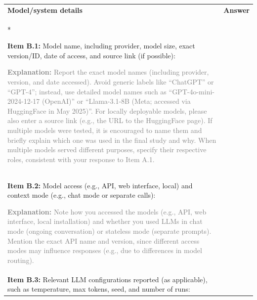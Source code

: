 \documentclass[12pt]{article}
\begin{document}
\begin{longtable}{|p{}|p{}|}
\hline
\rowcolor{green!20}
\textbf{Model/system details
} & \textbf{Answer} \\*   %
\hline

\textbf{Item B.1:} Model name, including provider, model size, exact version/ID, date of access, and source link (if possible): 

\textcolor{gray}{{\footnotesize
\textbf{Explanation:} Report the exact model names (including provider, version, and date accessed). Avoid generic labels like “ChatGPT” or “GPT-4”; instead, use detailed model names such as “GPT-4o-mini-2024-12-17 (OpenAI)” or “Llama-3.1-8B (Meta; accessed via HuggingFace in May 2025)”. For locally deployable models, please also enter a source link (e.g., the URL to the HuggingFace page). If multiple models were tested, it is encouraged to name them and briefly explain which one was used in the final study and why. When multiple models served different purposes, specify their respective roles, consistent with your response to Item A.1.}}
&   \\
\hline
\textbf{Item B.2:} Model access (e.g., API, web interface, local) and context mode (e.g., chat mode or separate calls): 

\textcolor{gray}{{\footnotesize
\textbf{Explanation:} Note how you accessed the models (e.g., API, web interface, local installation) and whether you used LLMs in chat mode (ongoing conversation) or stateless mode (separate prompts). Mention the exact API name and version, since different access modes may influence responses (e.g., due to differences in model routing). }}  &   \\
\hline
\textbf{Item B.3:} Relevant LLM configurations reported (as applicable), such as temperature, max tokens, seed, and number of runs:


\end{longtable}
\end{document}
